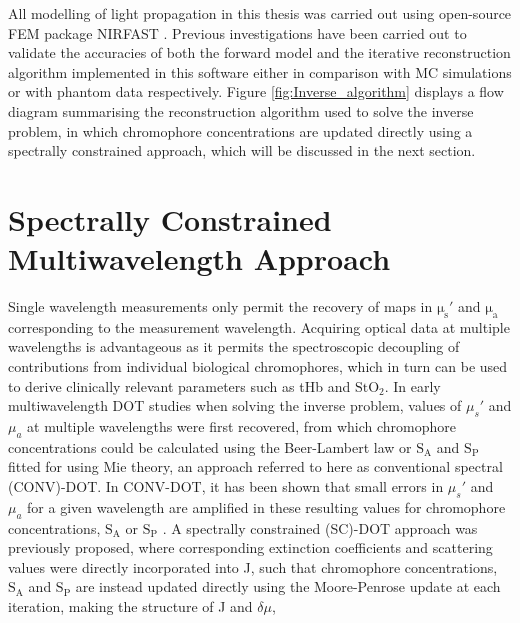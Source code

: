 \documentclass[twoside]{bhamthesis}
\theoremstyle{definition}
\begin{document}
All modelling of light propagation in this thesis was carried out using open-source FEM package NIRFAST \cite{dehghani2009near}. Previous investigations have been carried out to validate the accuracies of both the forward model and the iterative reconstruction algorithm implemented in this software either in comparison with MC simulations \cite{dehghani2003effects} or with phantom data \cite{dehghani2003multiwavelength} respectively. Figure \ref{fig:Inverse_algorithm} displays a flow diagram summarising the reconstruction algorithm used to solve the inverse problem, in which chromophore concentrations are updated directly using a spectrally constrained approach, which will be discussed in the next section.

\section{Spectrally Constrained Multiwavelength Approach}

\label{Spectrally Constrained Multiwavelength Approach}

Single wavelength measurements only permit the recovery of maps in $\mathrm{\mu_s'}$ and $\mathrm{\mu_a}$ corresponding to the measurement wavelength. Acquiring optical data at multiple wavelengths is advantageous as it permits the spectroscopic decoupling of contributions from individual biological chromophores, which in turn can be used to derive clinically relevant parameters such as tHb and $\mathrm{StO_2}$. In early multiwavelength DOT studies when solving the inverse problem, values of $\mu_s'$ and $\mu_a$ at multiple wavelengths were first recovered, from which chromophore concentrations could be calculated using the Beer-Lambert law or $\mathrm{S_A}$ and $\mathrm{S_P}$ fitted for using Mie theory, an approach referred to here as conventional spectral (CONV)-DOT. In CONV-DOT, it has been shown that small errors in $\mu_s'$ and $\mu_a$ for a given wavelength are amplified in these resulting values for chromophore concentrations, $\mathrm{S_A}$ or $\mathrm{S_P}$  \cite{srinivasan2003validation}. A spectrally constrained (SC)-DOT approach was previously proposed, where corresponding extinction coefficients and scattering values were directly incorporated into J, such that chromophore concentrations, $\mathrm{S_A}$ and $\mathrm{S_P}$ are instead updated directly using the Moore-Penrose update at each iteration, making the structure of J and $\delta \mu$,
\end{document}

